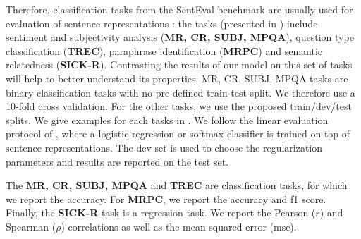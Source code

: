 Therefore, classification tasks from the SentEval benchmark are usually used for evaluation of sentence representations \parencite{conneau_18}: the tasks (presented in ) include sentiment and subjectivity analysis (\textbf{MR, CR, SUBJ, MPQA}), question type classification (\textbf{TREC}), paraphrase identification (\textbf{MRPC}) and semantic relatedness (\textbf{SICK-R}). Contrasting the results of our model on this set of tasks will help to better understand its properties. MR, CR, SUBJ, MPQA tasks are binary classification tasks with no pre-defined train-test split. We therefore use a 10-fold cross validation. For the other tasks, we use the proposed train/dev/test splits. We give examples for each tasks in .
We follow the linear evaluation protocol of \textcite{kiros_15}, where a logistic regression or softmax classifier is trained on top of sentence representations. The dev set is used to choose the regularization parameters and results are reported on the test set. 

The \textbf{MR, CR, SUBJ, MPQA} and \textbf{TREC} are classification tasks, for which we report the accuracy. For \textbf{MRPC}, we report the accuracy and f1 score. Finally, the \textbf{SICK-R} task is a regression task. We report the Pearson ($r$) and Spearman ($\rho$) correlations as well as the mean squared error (mse).


